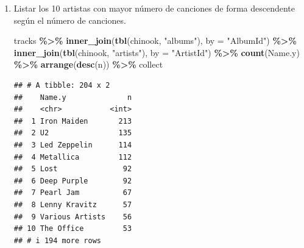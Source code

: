 \documentclass[
]{book}
\newenvironment{Shaded}{\begin{snugshade}}{\end{snugshade}}
\newcommand{\AttributeTok}[1]{\textcolor[rgb]{0.13,0.29,0.53}{#1}}
\newcommand{\FunctionTok}[1]{\textcolor[rgb]{0.13,0.29,0.53}{\textbf{#1}}}
\newcommand{\NormalTok}[1]{#1}
\newcommand{\OtherTok}[1]{\textcolor[rgb]{0.56,0.35,0.01}{#1}}
\newcommand{\SpecialCharTok}[1]{\textcolor[rgb]{0.81,0.36,0.00}{\textbf{#1}}}
\newcommand{\StringTok}[1]{\textcolor[rgb]{0.31,0.60,0.02}{#1}}
\theoremstyle{break}
\theoremstyle{nonumberplain}
\begin{document}
\begin{enumerate}
\begin{Shaded}
\begin{Highlighting}[]
\NormalTok{tracks }\OtherTok{\textless{}{-}} \FunctionTok{tbl}\NormalTok{(chinook, }\StringTok{"tracks"}\NormalTok{)}
\NormalTok{tracks }\SpecialCharTok{\%\textgreater{}\%} \FunctionTok{inner\_join}\NormalTok{(}\FunctionTok{tbl}\NormalTok{(chinook, }\StringTok{"genres"}\NormalTok{), }\AttributeTok{by =} \StringTok{"GenreId"}\NormalTok{) }\SpecialCharTok{\%\textgreater{}\%} \FunctionTok{count}\NormalTok{(Name.y) }\SpecialCharTok{\%\textgreater{}\%} 
    \FunctionTok{arrange}\NormalTok{(}\FunctionTok{desc}\NormalTok{(n)) }\SpecialCharTok{\%\textgreater{}\%}\NormalTok{ collect }\SpecialCharTok{\%\textgreater{}\%} \FunctionTok{mutate}\NormalTok{(}\AttributeTok{freq =}\NormalTok{ n }\SpecialCharTok{/} \FunctionTok{sum}\NormalTok{(n))}
\end{Highlighting}
\end{Shaded}

\begin{verbatim}
## # A tibble: 25 x 3
##    Name.y                 n   freq
##    <chr>              <int>  <dbl>
##  1 Rock                1297 0.370 
##  2 Latin                579 0.165 
##  3 Metal                374 0.107 
##  4 Alternative & Punk   332 0.0948
##  5 Jazz                 130 0.0371
##  6 TV Shows              93 0.0265
##  7 Blues                 81 0.0231
##  8 Classical             74 0.0211
##  9 Drama                 64 0.0183
## 10 R&B/Soul              61 0.0174
## # i 15 more rows
\end{verbatim}
\item
  Listar los 10 artistas con mayor número de canciones
  de forma descendente según el número de canciones.

\begin{Shaded}
\begin{Highlighting}[]
\NormalTok{tracks }\SpecialCharTok{\%\textgreater{}\%} \FunctionTok{inner\_join}\NormalTok{(}\FunctionTok{tbl}\NormalTok{(chinook, }\StringTok{"albums"}\NormalTok{), }\AttributeTok{by =} \StringTok{"AlbumId"}\NormalTok{) }\SpecialCharTok{\%\textgreater{}\%} 
    \FunctionTok{inner\_join}\NormalTok{(}\FunctionTok{tbl}\NormalTok{(chinook, }\StringTok{"artists"}\NormalTok{), }\AttributeTok{by =} \StringTok{"ArtistId"}\NormalTok{) }\SpecialCharTok{\%\textgreater{}\%} 
    \FunctionTok{count}\NormalTok{(Name.y) }\SpecialCharTok{\%\textgreater{}\%} \FunctionTok{arrange}\NormalTok{(}\FunctionTok{desc}\NormalTok{(n)) }\SpecialCharTok{\%\textgreater{}\%}\NormalTok{ collect}
\end{Highlighting}
\end{Shaded}

\begin{verbatim}
## # A tibble: 204 x 2
##    Name.y              n
##    <chr>           <int>
##  1 Iron Maiden       213
##  2 U2                135
##  3 Led Zeppelin      114
##  4 Metallica         112
##  5 Lost               92
##  6 Deep Purple        92
##  7 Pearl Jam          67
##  8 Lenny Kravitz      57
##  9 Various Artists    56
## 10 The Office         53
## # i 194 more rows
\end{verbatim}
\end{enumerate}
\end{document}
